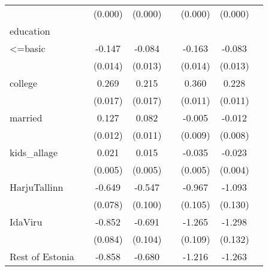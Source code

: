 {\begin{longtable}{l*{3}{c}|l*{3}{c}}
		&                     &     (0.000)         &     (0.000)         &                     &     (0.000)         &     (0.000)         \\
		education &&&&&\\
		<=basic             &                     &      -0.147\sym{***}&      -0.084\sym{***}&                     &      -0.163\sym{***}&      -0.083\sym{***}\\
		&                     &     (0.014)         &     (0.013)         &                     &     (0.014)         &     (0.013)         \\
		college             &                     &       0.269\sym{***}&       0.215\sym{***}&                     &       0.360\sym{***}&       0.228\sym{***}\\
		&                     &     (0.017)         &     (0.017)         &                     &     (0.011)         &     (0.011)         \\
		married           &                     &       0.127\sym{***}&       0.082\sym{***}&                     &      -0.005         &      -0.012         \\
		&                     &     (0.012)         &     (0.011)         &                     &     (0.009)         &     (0.008)         \\
		kids\_allage         &                     &       0.021\sym{***}&       0.015\sym{**} &                     &      -0.035\sym{***}&      -0.023\sym{***}\\
		&                     &     (0.005)         &     (0.005)         &                     &     (0.005)         &     (0.004)         \\
		HarjuTallinn      &                     &      -0.649\sym{***}&      -0.547\sym{***}&                     &      -0.967\sym{***}&      -1.093\sym{***}\\
		&                     &     (0.078)         &     (0.100)         &                     &     (0.105)         &     (0.130)         \\
		IdaViru           &                     &      -0.852\sym{***}&      -0.691\sym{***}&                     &      -1.265\sym{***}&      -1.298\sym{***}\\
		&                     &     (0.084)         &     (0.104)         &                     &     (0.109)         &     (0.132)         \\
		Rest of Estonia&                     &      -0.858\sym{***}&      -0.680\sym{***}&                     &      -1.216\sym{***}&      -1.263\sym{***}\\

\end{longtable}}
